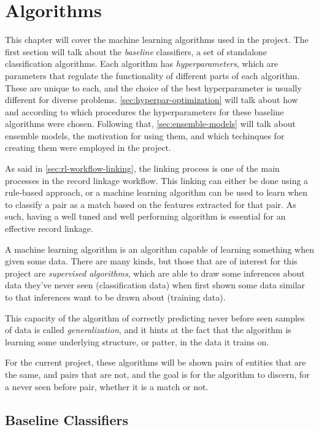 \documentclass[epsfig,a4paper,11pt,titlepage,twoside,openany]{book}
\begin{document}
\chapter{Algorithms}
\label{chap:algorithms}

This chapter will cover the machine learning algorithms used in the project. The first section will talk about the \textit{baseline} classifiers, a set of standalone classification algorithms. Each algorithm has \textit{hyperparameters}, which are parameters that regulate the functionality of different parts of each algorithm. These are unique to each, and the choice of the best hyperparameter is usually different for diverse problems. \autoref{sec:hyperpar-optimization} will talk about how and according to which procedures the hyperparameters for these baseline algorithms were chosen. Following that, \autoref{sec:ensemble-models} will talk about ensemble models, the motivation for using them, and which techinques for creating them were employed in the project.

As said in \autoref{sec:rl-workflow-linking}, the linking process is one of the main processes in the record linkage workflow. This linking can either be done using a rule-based approach, or a machine learning algorithm can be used to learn when to classify a pair as a match based on the features extracted for that pair. As such, having a well tuned and well performing algorithm is essential for an effective record linkage.

A machine learning algorithm \cite{Russell:2009:AIM:1671238} is an algorithm capable of learning something when given some data. There are many kinds, but those that are of interest for this project are \textit{supervised algorithms}, which are able to draw some inferences about data they've never seen (classification data) when first shown some data similar to that inferences want to be drawn about (training data). 

This capacity of the algorithm of correctly predicting never before seen samples of data is called \textit{generalization}, and it hints at the fact that the algorithm is learning some underlying structure, or patter, in the data it trains on.

For the current project, these algorithms will be shown pairs of entities that are the same, and pairs that are not, and the goal is for the algorithm to discern, for a never seen before pair, whether it is a match or not.


\section{Baseline Classifiers}
\label{sec:baseline-classifiers}
\end{document}

